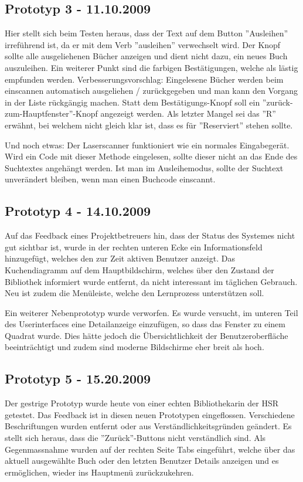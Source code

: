 \documentclass[10pt, a4paper]{scrartcl}
\begin{document}
\subsection{Prototyp 3 - 11.10.2009} Hier stellt sich beim Testen heraus, dass der Text auf dem Button ''Ausleihen'' irreführend ist, da er mit dem Verb ''ausleihen'' verwechselt wird. Der Knopf sollte alle ausgeliehenen Bücher anzeigen und dient nicht dazu, ein neues Buch auszuleihen. Ein weiterer Punkt sind die farbigen Bestätigungen, welche als lästig empfunden werden. Verbesserungsvorschlag: Eingelesene Bücher werden beim einscannen automatisch ausgeliehen / zurückgegeben und man kann den Vorgang in der Liste rückgängig machen. Statt dem Bestätigungs-Knopf soll ein ''zurück-zum-Hauptfenster''-Knopf angezeigt werden. Als letzter Mangel sei das ''R'' erwähnt, bei welchem nicht gleich klar ist, dass es für ''Reserviert'' stehen sollte. 

Und noch etwas: Der Laserscanner funktioniert wie ein normales Eingabegerät. Wird ein Code mit dieser Methode eingelesen, sollte dieser nicht an das Ende des Suchtextes angehängt werden. Ist man im Ausleihemodus, sollte der Suchtext unverändert bleiben, wenn man einen Buchcode einscannt.

\subsection{Prototyp 4 - 14.10.2009} Auf das Feedback eines Projektbetreuers hin, dass der Status des Systemes nicht gut sichtbar ist, wurde in der rechten unteren Ecke ein Informationsfeld hinzugefügt, welches den zur Zeit aktiven Benutzer anzeigt. Das Kuchendiagramm auf dem Hauptbildschirm, welches über den Zustand der Bibliothek informiert wurde entfernt, da nicht interessant im täglichen Gebrauch. Neu ist zudem die Menüleiste, welche den Lernprozess unterstützen soll.

Ein weiterer Nebenprototyp wurde verworfen. Es wurde versucht, im unteren Teil des Userinterfaces eine Detailanzeige einzufügen, so dass das Fenster zu einem Quadrat wurde. Dies hätte jedoch die Übersichtlichkeit der Benutzeroberfläche beeinträchtigt und zudem sind moderne Bildschirme eher breit als hoch.

\subsection{Prototyp 5 - 15.20.2009} Der gestrige Prototyp wurde heute von einer echten Bibliothekarin der HSR getestet. Das Feedback ist in diesen neuen Prototypen eingeflossen. Verschiedene Beschriftungen wurden entfernt oder aus Verständlichkeitsgründen geändert. Es stellt sich heraus, dass die ''Zurück''-Buttons nicht verständlich sind. Als Gegenmassnahme wurden auf der rechten Seite Tabs eingeführt, welche über das aktuell ausgewählte Buch oder den letzten Benutzer Details anzeigen und es ermöglichen, wieder ins Hauptmenü zurückzukehren.
\end{document}
